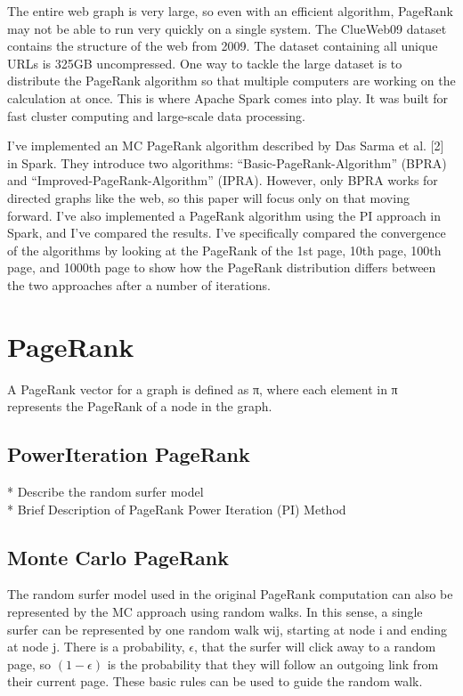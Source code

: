 \documentclass[letterpaper, 10 pt, conference]{ieeeconf}  %
\begin{document}
The entire web graph is very large, so even with an efficient algorithm, PageRank may not be able to run very quickly on a single system. The ClueWeb09 dataset contains the structure of the web from 2009. The dataset containing all unique URLs is 325GB uncompressed. One way to tackle the large dataset is to distribute the PageRank algorithm so that multiple computers are working on the calculation at once. This is where Apache Spark comes into play. It was built for fast cluster computing and large-scale data processing.

I’ve implemented an MC PageRank algorithm described by Das Sarma et al. [2] in Spark. They introduce two algorithms: “Basic-PageRank-Algorithm” (BPRA) and “Improved-PageRank-Algorithm” (IPRA). However, only BPRA works for directed graphs like the web, so this paper will focus only on that moving forward. I’ve also implemented a PageRank algorithm using the PI approach in Spark, and I’ve compared the results. I’ve specifically compared the convergence of the algorithms by looking at the PageRank of the 1st page, 10th page, 100th page, and 1000th page to show how the PageRank distribution differs between the two approaches after a number of iterations.


\section{PageRank}
\label{sec:md}
A PageRank vector for a graph is defined as π, where each element in π represents the PageRank of a node in the graph.

\subsection{PowerIteration PageRank}
* Describe the random surfer model \\
* Brief Description of PageRank Power Iteration (PI) Method

\subsection{Monte Carlo PageRank}
The random surfer model used in the original PageRank computation can also be represented by the MC approach using random walks. In this sense, a single surfer can be represented by one random walk wij, starting at node i and ending at node j. There is a probability, $\epsilon$, that the surfer will click away to a random page, so $(1-\epsilon)$ is the probability that they will follow an outgoing link from their current page. These basic rules can be used to guide the random walk. 
\end{document}
